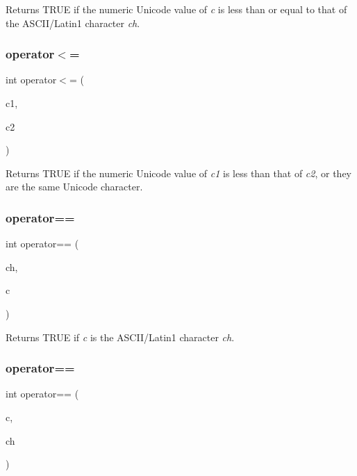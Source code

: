Returns T\+R\+UE if the numeric Unicode value of {\itshape c} is less than or equal to that of the A\+S\+C\+I\+I/\+Latin1 character {\itshape ch}. \mbox{\label{class_q_char_a9abfb242d26e415adaa25d52fd8a93fd}} 
\subsubsection{\texorpdfstring{operator$<$=}{operator<=}\hspace{0.1cm}{\footnotesize\ttfamily [3/3]}}
{\footnotesize\ttfamily int operator$<$= (\begin{DoxyParamCaption}\item[{\mbox{\hyperlink{class_q_char}{Q\+Char}}}]{c1,  }\item[{\mbox{\hyperlink{class_q_char}{Q\+Char}}}]{c2 }\end{DoxyParamCaption})\hspace{0.3cm}{\ttfamily [friend]}}

Returns T\+R\+UE if the numeric Unicode value of {\itshape c1} is less than that of {\itshape c2}, or they are the same Unicode character. \mbox{\label{class_q_char_a626d918781f80dcff42d03ff6749930d}} 
\subsubsection{\texorpdfstring{operator==}{operator==}\hspace{0.1cm}{\footnotesize\ttfamily [1/3]}}
{\footnotesize\ttfamily int operator== (\begin{DoxyParamCaption}\item[{char}]{ch,  }\item[{\mbox{\hyperlink{class_q_char}{Q\+Char}}}]{c }\end{DoxyParamCaption})\hspace{0.3cm}{\ttfamily [friend]}}

Returns T\+R\+UE if {\itshape c} is the A\+S\+C\+I\+I/\+Latin1 character {\itshape ch}. \mbox{\label{class_q_char_a2deebc031e4e7ddaf75f71439b0ec58a}} 
\subsubsection{\texorpdfstring{operator==}{operator==}\hspace{0.1cm}{\footnotesize\ttfamily [2/3]}}
{\footnotesize\ttfamily int operator== (\begin{DoxyParamCaption}\item[{\mbox{\hyperlink{class_q_char}{Q\+Char}}}]{c,  }\item[{char}]{ch }\end{DoxyParamCaption})\hspace{0.3cm}{\ttfamily [friend]}}


